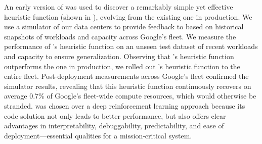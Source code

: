 An early version of \method was used to discover a remarkably simple yet effective heuristic function (shown in ), evolving from the existing one in production. We use a simulator of our data centers to provide feedback to \method based on historical snapshots of workloads and capacity across Google’s fleet. We measure the performance of \method's heuristic function on an unseen test dataset of recent workloads and capacity to ensure generalization. Observing that \method's heuristic function outperforms the one in production, we rolled out \method's heuristic function to the entire fleet. Post-deployment measurements across Google’s fleet confirmed the simulator results, revealing that this heuristic function continuously recovers on average 0.7\% of Google’s fleet-wide compute resources, which would otherwise be stranded. \method was chosen over a deep reinforcement learning approach because its code solution not only leads to better performance, but also offers clear advantages in interpretability, debuggability, predictability, and ease of deployment—essential qualities for a mission-critical system.

